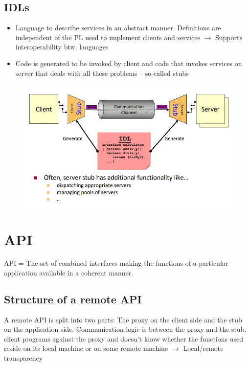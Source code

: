 		\subsection{IDLs}
			\begin{itemize}
				\item Language to describe services in an abstract manner. Definitions are independent of the PL used to implement clients and services $ \rightarrow $ Supports interoperability btw. languages
				
				\item Code is generated to be invoked by client and code that invokes services on server that deals with all these problems – so-called stubs
			\end{itemize}
			\begin{figure}[h!]
				\includegraphics[scale=0.5]{res/idl-stubs.jpg}
			\end{figure}
		
	\section{API}
		API = The set of combined interfaces making the functions of a particular application available in a coherent
		manner.
		\subsection{Structure of a remote API}
			A remote API is split into two parts: The proxy on the client side and the stub on the application side.
			Communication logic is between the proxy and the stub.\\
			client programs against the	proxy and doesn’t know whether the functions used reside on its	local machine or on some remote machine $ \rightarrow $ Local/remote transparency
			
